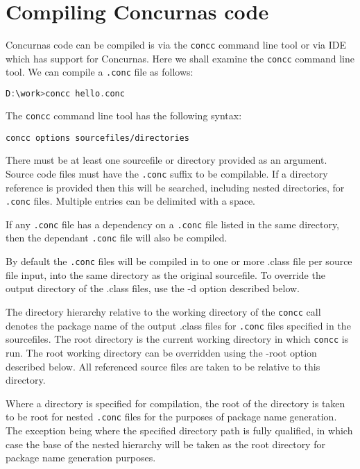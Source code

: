 \documentclass[conc-doc]{subfiles}
\begin{document}
	\chapter[Compiling Concurnas code]{Compiling Concurnas code}
	\label{ch:concc}
	

Concurnas code can be compiled is via the \lstinline{concc} command line tool or via IDE which has support for Concurnas. Here we shall examine the \lstinline{concc} command line tool. We can compile a \lstinline{.conc} file as follows:

\begin{lstlisting}[language=C]
D:\work>concc hello.conc
\end{lstlisting}

The \lstinline{concc} command line tool has the following syntax:

\begin{center}
\lstinline{concc options sourcefiles/directories}
\end{center}

There must be at least one sourcefile or directory provided as an argument. Source code files must have the \lstinline{.conc} suffix to be compilable. If a directory reference is provided then this will be searched, including nested directories, for \lstinline{.conc} files. Multiple entries can be delimited with a space.

If any \lstinline{.conc} file has a dependency on a \lstinline{.conc} file listed in the same directory, then the dependant \lstinline{.conc} file will also be compiled.

By default the \lstinline{.conc} files will be compiled in to one or more .class file per source file input, into the same directory as the original sourcefile. To override the output directory of the .class files, use the -d option described below.

The directory hierarchy relative to the working directory of the \lstinline{concc} call denotes the package name of the output .class files for \lstinline{.conc} files specified in the sourcefiles. The root directory is the current working directory in which \lstinline{concc} is run. The root working directory can be overridden using the -root option described below. All referenced source files are taken to be relative to this directory.

Where a directory is specified for compilation, the root of the directory is taken to be root for nested \lstinline{.conc} files for the purposes of package name generation. The exception being where the specified directory path is fully qualified, in which case the base of the nested hierarchy will be taken as the root directory for package name generation purposes.
\end{document}
